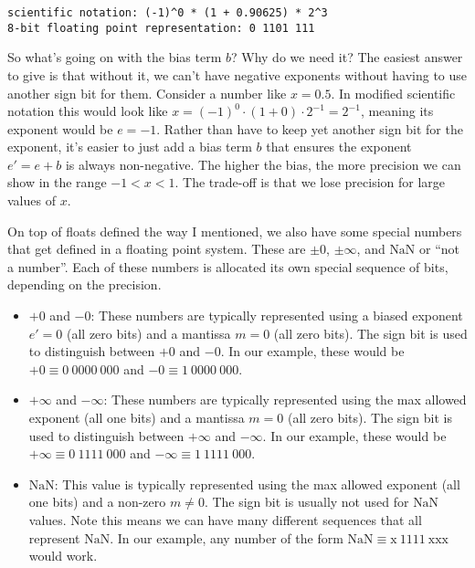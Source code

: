 \documentclass[
  letterpaper,
  DIV=11,
  numbers=noendperiod]{scrreprt}
\providecommand{\tightlist}{%
  \setlength{\itemsep}{0pt}\setlength{\parskip}{0pt}}\usepackage{longtable,booktabs,array}
\begin{document}
\begin{verbatim}
scientific notation: (-1)^0 * (1 + 0.90625) * 2^3
8-bit floating point representation: 0 1101 111
\end{verbatim}

So what's going on with the bias term \(b\)? Why do we need it? The
easiest answer to give is that without it, we can't have negative
exponents without having to use another sign bit for them. Consider a
number like \(x=0.5\). In modified scientific notation this would look
like \(x=(-1)^0 \cdot (1+0) \cdot 2^{-1} = 2^{-1}\), meaning its
exponent would be \(e=-1\). Rather than have to keep yet another sign
bit for the exponent, it's easier to just add a bias term \(b\) that
ensures the exponent \(e'=e+b\) is always non-negative. The higher the
bias, the more precision we can show in the range \(-1 < x < 1\). The
trade-off is that we lose precision for large values of \(x\).

On top of floats defined the way I mentioned, we also have some special
numbers that get defined in a floating point system. These are
\(\pm 0\), \(\pm \infty\), and \(\text{NaN}\) or ``not a number''. Each
of these numbers is allocated its own special sequence of bits,
depending on the precision.

\begin{itemize}
\tightlist
\item
  \(+0\) and \(-0\): These numbers are typically represented using a
  biased exponent \(e'=0\) (all zero bits) and a mantissa \(m=0\) (all
  zero bits). The sign bit is used to distinguish between \(+0\) and
  \(-0\). In our example, these would be \(+0 \equiv 0 \ 0000 \ 000\)
  and \(-0 \equiv 1 \ 0000 \ 000\).
\item
  \(+\infty\) and \(-\infty\): These numbers are typically represented
  using the max allowed exponent (all one bits) and a mantissa \(m=0\)
  (all zero bits). The sign bit is used to distinguish between
  \(+\infty\) and \(-\infty\). In our example, these would be
  \(+\infty \equiv 0 \ 1111 \ 000\) and
  \(-\infty \equiv 1 \ 1111 \ 000\).
\item
  \(\text{NaN}\): This value is typically represented using the max
  allowed exponent (all one bits) and a non-zero \(m \neq 0\). The sign
  bit is usually not used for \(\text{NaN}\) values. Note this means we
  can have many different sequences that all represent \(\text{NaN}\).
  In our example, any number of the form
  \(\text{NaN} \equiv \text{x} \ 1111 \ \text{xxx}\) would work.
\end{itemize}
\end{document}
